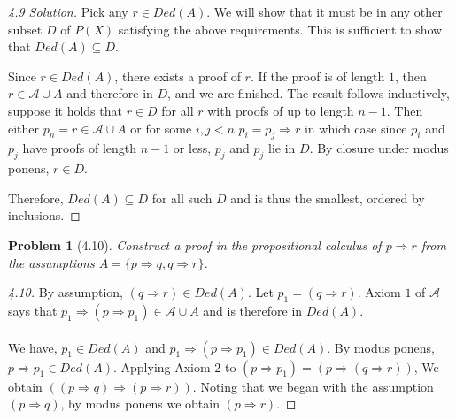 \documentclass{article}
\theoremstyle{problemstyle}
\newtheorem{problem}{Problem}
\begin{document}
\begin{proof}[4.9 Solution]
Pick any $r \in Ded(A)$. We will show that it must be in any other subset $D$ of $P(X)$ satisfying the above requirements. This is sufficient to show that $Ded(A) \subseteq D$. 

Since $r \in Ded(A)$, there exists a proof of $r$. If the proof is of length $1$, then $r \in \mathscr{A} \cup A$ and therefore in $D$, and we are finished. The result follows inductively, suppose it holds that $r \in D$ for all $r$ with proofs of up to length $n-1$. Then either $p_n = r \in \mathscr{A} \cup A$ or for some $i,j<n$ $p_i = p_j \Rightarrow r$ in which case since $p_i$ and $p_j$ have proofs of length $n-1$ or less, $p_j$ and $p_j$ lie in $D$.  By closure under modus ponens, $r \in D$. 

Therefore, $Ded(A) \subseteq D$ for all such $D$ and is thus the smallest, ordered by inclusions. 
\end{proof}

\begin{problem}[4.10] 
Construct a proof in the propositional calculus of $p \Rightarrow r$ from the assumptions $A = \{p\Rightarrow q, q\Rightarrow r\}$. 
\end{problem}
\begin{proof}[4.10] 
By assumption, $(q \Rightarrow r) \in Ded(A)$. Let $p_1 = (q \Rightarrow r)$. Axiom $1$ of $\mathscr{A}$ says that $p_1 \Rightarrow (p \Rightarrow p_1) \in \mathscr{A} \cup A$ and is therefore in $Ded(A)$.\\\\We have, $p_1 \in Ded(A)$ and $p_1 \Rightarrow (p \Rightarrow p_1) \in Ded(A)$. By modus ponens, $p \Rightarrow p_1 \in Ded(A)$. Applying Axiom $2$ to $(p \Rightarrow p_1) = (p \Rightarrow (q \Rightarrow r))$, We obtain $((p \Rightarrow q) \Rightarrow (p \Rightarrow r))$. Noting that we began with the assumption $(p \Rightarrow q)$, by modus ponens we obtain $(p \Rightarrow r)$.
\end{proof}
\end{document}
